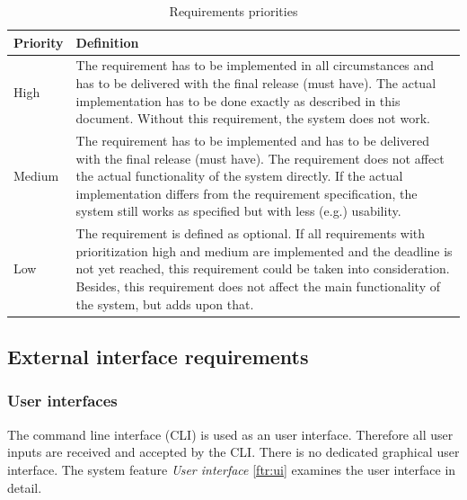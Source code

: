 \documentclass[a4paper]{article}
\newcommand{\arraystrechlength}{1.5}
\begin{document}
\begin{table}[h]
{\renewcommand{\arraystretch}{\arraystrechlength}
    \begin{tabular}{ | >{\columncolor{vu-grey-50}}m{100pt} | m{230pt} | }
    
    \hline
    \rowcolor{vu-blue}
    \textcolor{vu-white}{\textbf{Priority}} & \textcolor{vu-white}{\textbf{Definition}} \\ \hline
    
    High &
    The requirement has to be implemented in all circumstances and has to be delivered with the final release (must have). The actual implementation has to be done exactly as described in this document. Without this requirement, the system does not work.
    \\ \hline
    
    Medium &
    The requirement has to be implemented and has to be delivered with the final release (must have). The requirement does not affect the actual functionality of the system directly. If the actual implementation differs from the requirement specification, the system still works as specified but with less (e.g.) usability.
    \\ \hline
    
    Low &
    The requirement is defined as optional. If all requirements with prioritization high and medium are implemented and the deadline is not yet reached, this requirement could be taken into consideration. Besides, this requirement does not affect the main functionality of the system, but adds upon that.
    \\ \hline
    
    \end{tabular}
}
\caption{Requirements priorities}
\label{table:req-prios}
\end{table}

\clearpage
\subsection{External interface requirements}
\subsubsection{User interfaces}
The command line interface (CLI) is used as an user interface. Therefore all user inputs are received and accepted by the CLI. There is no dedicated graphical user interface. The system feature \textit{User interface} \ref{ftr:ui} examines the user interface in detail.
\end{document}
